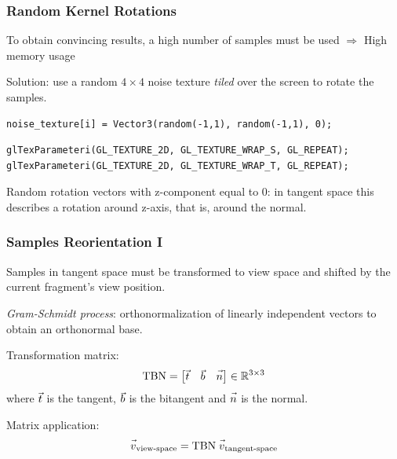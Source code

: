 \documentclass{beamer}
\let\nvec\vec
\def\vec#1{\nvec{\vphantom t\smash{#1}}}
\begin{document}
\begin{frame}[fragile]
\frametitle{Random Kernel Rotations}
To obtain convincing results, a high number of samples must be used $ \Rightarrow $ High memory usage

Solution: use a random $ 4\times4 $ noise texture \emph{tiled} over the screen to rotate the samples.
\begin{verbatim}
noise_texture[i] = Vector3(random(-1,1), random(-1,1), 0);
\end{verbatim}
\vspace{-1cm}
\begin{verbatim}
glTexParameteri(GL_TEXTURE_2D, GL_TEXTURE_WRAP_S, GL_REPEAT);
glTexParameteri(GL_TEXTURE_2D, GL_TEXTURE_WRAP_T, GL_REPEAT);
\end{verbatim} 

Random rotation vectors with z-component equal to 0: in tangent space this describes a rotation around z-axis, that is, around the normal.

\end{frame}

\begin{frame}
\frametitle{Samples Reorientation I}
Samples in tangent space must be transformed to view space and shifted by the current fragment's view position.

\emph{Gram-Schmidt process}: orthonormalization of linearly independent vectors to obtain an orthonormal base.



Transformation matrix:
\[
\text{TBN} = 
\begin{bmatrix}
\vec{t} & \vec{b} & \vec{n}
\end{bmatrix} \in \mathbb{R}^{3\times3}
\]
where $ \vec{t} $ is the tangent, $ \vec{b} $ is the bitangent and $ \vec{n} $ is the normal.

Matrix application:
\[ \vec{v}_{\text{view-space}} = \text{TBN} \; \vec{v}_{\text{tangent-space}} \]
\end{frame}
\end{document}
